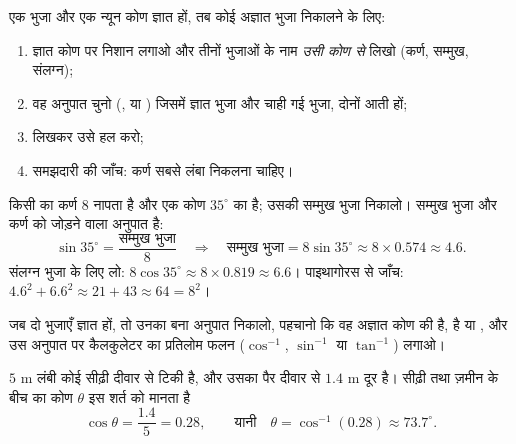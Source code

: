 \begin{method}[कोई भुजा निकालना]\label{met:g9:trig:side}
एक भुजा और एक न्यून कोण ज्ञात हों, तब कोई अज्ञात भुजा निकालने के लिए:
\begin{enumerate}
  \item ज्ञात कोण पर निशान लगाओ और तीनों भुजाओं के नाम \emph{उसी कोण
        से} लिखो (कर्ण, सम्मुख, संलग्न);
  \item वह अनुपात चुनो (,  या ) जिसमें ज्ञात
        भुजा और चाही गई भुजा, दोनों आती हों;
  \item {} लिखकर उसे हल करो;
  \item समझदारी की जाँच: कर्ण सबसे लंबा निकलना चाहिए।
\end{enumerate}
\end{method}

\begin{example}\label{ex:g9:trig:side}
किसी  का कर्ण $8$ नापता है और एक कोण $35^\circ$ का है;
उसकी सम्मुख भुजा निकालो। सम्मुख भुजा और कर्ण को जोड़ने वाला अनुपात
 है:
\[
\sin 35^\circ = \frac{\text{सम्मुख भुजा}}{8}
\quad\Longrightarrow\quad
\text{सम्मुख भुजा} = 8 \sin 35^\circ \approx 8 \times 0.574 \approx 4.6 .
\]
संलग्न भुजा के लिए  लो:
$8\cos 35^\circ \approx 8 \times 0.819 \approx 6.6$। पाइथागोरस से
जाँच: $4.6^2 + 6.6^2 \approx 21 + 43 \approx 64 = 8^2$।
\end{example}

\begin{method}[कोई कोण निकालना]\label{met:g9:trig:angle}
जब दो भुजाएँ ज्ञात हों, तो उनका बना अनुपात निकालो, पहचानो कि वह अज्ञात
कोण की  है,  है या , और उस अनुपात पर कैलकुलेटर का
प्रतिलोम फलन ($\cos^{-1}$, $\sin^{-1}$ या $\tan^{-1}$) लगाओ।
\end{method}

\begin{example}\label{ex:g9:trig:angle}
$5$ m लंबी कोई सीढ़ी दीवार से टिकी है, और उसका पैर दीवार से $1.4$ m
दूर है। सीढ़ी तथा ज़मीन के बीच का कोण $\theta$ इस शर्त को मानता है
\[
\cos\theta = \frac{1.4}{5} = 0.28,
\qquad\text{यानी}\quad
\theta = \cos^{-1}(0.28) \approx 73.7^\circ .
\]
\end{example}

